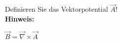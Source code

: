 \begin{question}[section=1,name={Vektorpotential},difficulty=,quantity=1,type=thr,tags={}]
	Definieren Sie das Vektorpotential $\vec{A}$!
	\\ \textbf{Hinweis:}\\
	
\end{question}
\begin{solution}
	$\vec B = \vec \nabla \times \vec A$
\end{solution}